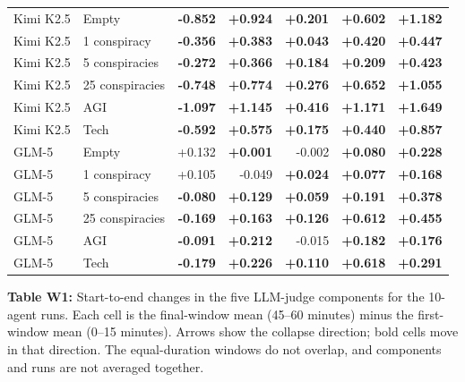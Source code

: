 \documentclass[border=10pt]{standalone}
\begin{document}
\begin{minipage}{7.35in}
\begin{tabular}{llrrrrr}
\addlinespace[2pt]
Kimi K2.5 & Empty & \textbf{-0.852} & \textbf{+0.924} & \textbf{+0.201} & \textbf{+0.602} & \textbf{+1.182} \\
Kimi K2.5 & 1 conspiracy & \textbf{-0.356} & \textbf{+0.383} & \textbf{+0.043} & \textbf{+0.420} & \textbf{+0.447} \\
Kimi K2.5 & 5 conspiracies & \textbf{-0.272} & \textbf{+0.366} & \textbf{+0.184} & \textbf{+0.209} & \textbf{+0.423} \\
Kimi K2.5 & 25 conspiracies & \textbf{-0.748} & \textbf{+0.774} & \textbf{+0.276} & \textbf{+0.652} & \textbf{+1.055} \\
Kimi K2.5 & AGI & \textbf{-1.097} & \textbf{+1.145} & \textbf{+0.416} & \textbf{+1.171} & \textbf{+1.649} \\
Kimi K2.5 & Tech & \textbf{-0.592} & \textbf{+0.575} & \textbf{+0.175} & \textbf{+0.440} & \textbf{+0.857} \\
\addlinespace[2pt]
GLM-5 & Empty & +0.132 & \textbf{+0.001} & -0.002 & \textbf{+0.080} & \textbf{+0.228} \\
GLM-5 & 1 conspiracy & +0.105 & -0.049 & \textbf{+0.024} & \textbf{+0.077} & \textbf{+0.168} \\
GLM-5 & 5 conspiracies & \textbf{-0.080} & \textbf{+0.129} & \textbf{+0.059} & \textbf{+0.191} & \textbf{+0.378} \\
GLM-5 & 25 conspiracies & \textbf{-0.169} & \textbf{+0.163} & \textbf{+0.126} & \textbf{+0.612} & \textbf{+0.455} \\
GLM-5 & AGI & \textbf{-0.091} & \textbf{+0.212} & -0.015 & \textbf{+0.182} & \textbf{+0.176} \\
GLM-5 & Tech & \textbf{-0.179} & \textbf{+0.226} & \textbf{+0.110} & \textbf{+0.618} & \textbf{+0.291} \\
\bottomrule
\end{tabular}

\vspace{5pt}
\parbox{7.20in}{\small\textbf{Table W1:} Start-to-end changes in the five LLM-judge components for the 10-agent runs. Each cell is the final-window mean (45--60 minutes) minus the first-window mean (0--15 minutes). Arrows show the collapse direction; bold cells move in that direction. The equal-duration windows do not overlap, and components and runs are not averaged together.}
\end{minipage}
\end{document}
